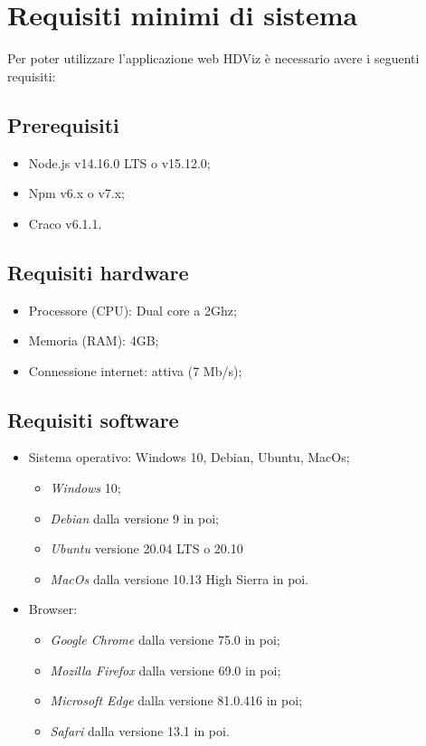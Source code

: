 \section{Requisiti minimi di sistema}
Per poter utilizzare l'applicazione web HDViz è necessario avere i seguenti requisiti:
\subsection{Prerequisiti}
\begin{itemize}
	\item Node.js v14.16.0 LTS o v15.12.0;
	\item Npm v6.x o v7.x;
	\item Craco v6.1.1.
\end{itemize}
\subsection{Requisiti hardware}
\begin{itemize}
	
	\item Processore (CPU): Dual core a 2Ghz;
	\item Memoria (RAM): 4GB;
	\item Connessione internet: attiva (7 Mb/s);
\end{itemize}

\subsection{Requisiti software}
\begin{itemize}
	\item Sistema operativo: Windows 10, Debian, Ubuntu, MacOs;
	\begin{itemize}
		\item  \textit{Windows} 10;
		\item \textit{Debian} dalla versione 9 in poi;
		\item \textit{Ubuntu} versione 20.04 LTS o 20.10
		\item \textit{MacOs} dalla versione 10.13 High Sierra in poi.
	\end{itemize}
	\item Browser: 
	\begin{itemize}
		\item  \textit{Google Chrome} dalla versione 75.0 in poi;
		\item \textit{Mozilla Firefox} dalla versione 69.0 in poi;
		\item \textit{Microsoft Edge} dalla versione 81.0.416 in poi;
		\item \textit{Safari} dalla versione 13.1 in poi.
	\end{itemize}	 
\end{itemize}
